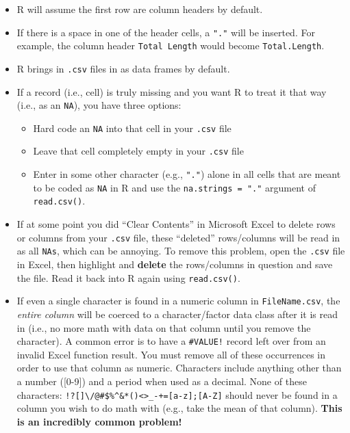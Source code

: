 \documentclass[]{book}
\providecommand{\tightlist}{%
  \setlength{\itemsep}{0pt}\setlength{\parskip}{0pt}}
\theoremstyle{definition}
\theoremstyle{definition}
\theoremstyle{definition}
\theoremstyle{remark}
\begin{document}
\begin{itemize}
\tightlist
\item
  R will assume the first row are column headers by default.
\item
  If there is a space in one of the header cells, a \texttt{"."} will be
  inserted. For example, the column header \texttt{Total\ Length} would
  become \texttt{Total.Length}.
\item
  R brings in \texttt{.csv} files in as data frames by default.
\item
  If a record (i.e., cell) is truly missing and you want R to treat it
  that way (i.e., as an \texttt{NA}), you have three options:

  \begin{itemize}
  \tightlist
  \item
    Hard code an \texttt{NA} into that cell in your \texttt{.csv} file
  \item
    Leave that cell completely empty in your \texttt{.csv} file
  \item
    Enter in some other character (e.g., \texttt{"."}) alone in all
    cells that are meant to be coded as \texttt{NA} in R and use the
    \texttt{na.strings\ =\ "."} argument of \texttt{read.csv()}.
  \end{itemize}
\item
  If at some point you did ``Clear Contents'' in Microsoft Excel to
  delete rows or columns from your \texttt{.csv} file, these ``deleted''
  rows/columns will be read in as all \texttt{NAs}, which can be
  annoying. To remove this problem, open the \texttt{.csv} file in
  Excel, then highlight and \textbf{delete} the rows/columns in question
  and save the file. Read it back into R again using
  \texttt{read.csv()}.
\item
  If even a single character is found in a numeric column in
  \texttt{FileName.csv}, the \emph{entire column} will be coerced to a
  character/factor data class after it is read in (i.e., no more math
  with data on that column until you remove the character). A common
  error is to have a \texttt{\#VALUE!} record left over from an invalid
  Excel function result. You must remove all of these occurrences in
  order to use that column as numeric. Characters include anything other
  than a number ({[}0-9{]}) and a period when used as a decimal. None of
  these characters:
  \texttt{!?{[}{]}\textbackslash{}/@\#\$\%\^{}\&*()\textless{}\textgreater{}\_-+={[}a-z{]};{[}A-Z{]}}
  should never be found in a column you wish to do math with (e.g., take
  the mean of that column). \textbf{This is an incredibly common
  problem!}
\end{itemize}
\end{document}
